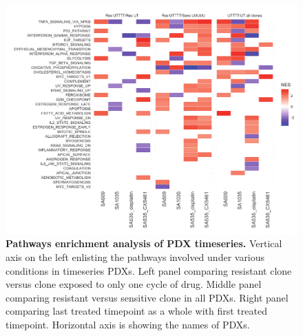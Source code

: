 \begin{figure}
\centering
  \includegraphics[width=\textwidth]{Figures/fig5pathwaysnetwork.pdf}
\caption[Pathways enrichment analysis of PDX timeseries]
	{\small
	\textbf{Pathways enrichment analysis of PDX timeseries.}
	 Vertical axis on the left enlisting the pathways involved under various conditions in timeseries PDXs. Left panel comparing resistant clone versus clone exposed to only one cycle of drug. Middle panel comparing resistant versus sensitive clone in all PDXs. Right panel comparing last treated timepoint as a whole with first treated timepoint. Horizontal axis is showing the names of PDXs.
	}
	\label{fig:fig5pathwaysnetwork}
\end{figure}


